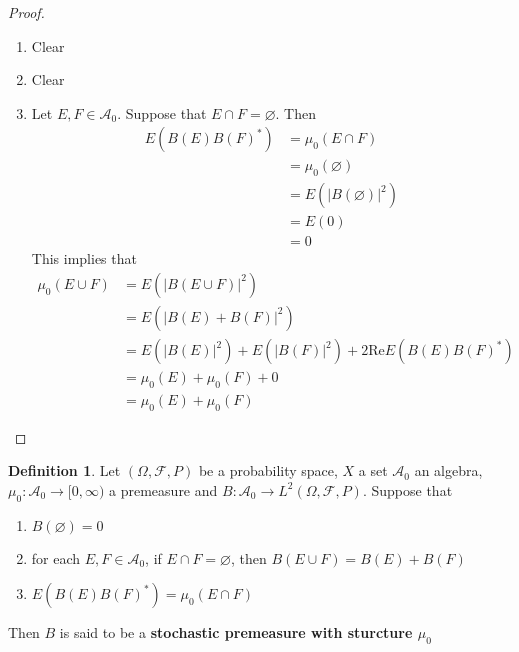 \documentclass[12pt]{amsart}
\theoremstyle{definition}
\newtheorem{defn}[definition]{Definition}
\newcommand{\Om}{\Omega}
\newcommand{\MA}{\mathcal{A}}
\newcommand{\MF}{\mathcal{F}}
\renewcommand{\Re}{\text{Re}}
\newcommand{\Rg}{[0,\infty)}
\begin{document}
	\begin{proof}\
	\begin{enumerate}
	\item Clear 
	\item Clear
	\item Let $E, F \in \MA_0$. Suppose that $E \cap F = \varnothing$. Then 
	\begin{align*}
	E(B(E)B(F)^*) 
	&= \mu_0(E \cap F) \\
	&= \mu_0(\varnothing) \\
	&= E(|B(\varnothing)|^2) \\
	&= E(0) \\
	&= 0
	\end{align*}
	This implies that 
	\begin{align*}
	\mu_0(E \cup F) 
	&= E(|B(E \cup F)|^2) \\
	&= E(|B(E) + B(F)|^2) \\
	&= E(|B(E)|^2) + E(|B(F)|^2) + 2 \Re E(B(E)B(F)^*) \\
	&= \mu_0(E) + \mu_0(F) +0  \\
	&=  \mu_0(E) + \mu_0(F) 
	\end{align*}
	\end{enumerate}
	\end{proof}
	
	\begin{defn}
	Let $(\Om, \MF, P)$ be a probability space, $X$ a set $\MA_0$ an algebra, $\mu_0:\MA_0 \rightarrow \Rg$ a premeasure and $B:\MA_0 \rightarrow L^2(\Om, \MF, P)$. 
	Suppose that 
	\begin{enumerate}
	\item $B(\varnothing) = 0$
	\item for each $E, F \in \MA_0$, if $E \cap F = \varnothing$, then $B(E \cup F) = B(E) + B(F)$
	\item $E (B(E)B(F)^*) = \mu_0(E \cap F)$
	\end{enumerate}
	Then $B$ is said to be a \textbf{stochastic premeasure with sturcture $\mu_0$}
	
	\end{defn}
	
\end{document}
